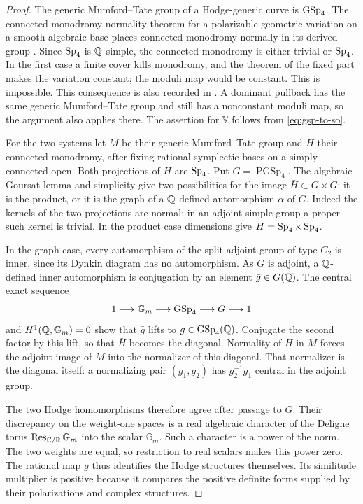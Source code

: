 \begin{proof}
The generic Mumford--Tate group of a Hodge-generic curve is $\operatorname{GSp}_4$.
The connected monodromy normality theorem for a polarizable geometric
variation on a smooth algebraic base places connected monodromy normally
in its derived group \cite[\S5, Theorem~1]{Andre1992}.  Since $\operatorname{Sp}_4$ is
$\mathbb Q$-simple, the connected monodromy is either trivial or $\operatorname{Sp}_4$.
In the first case a finite cover kills monodromy, and the theorem of the
fixed part makes the variation constant; the moduli map would be
constant.  This is impossible.  This consequence is also recorded in
\cite[\S6, Remark~1]{Andre1992}.  A dominant pullback has the same generic
Mumford--Tate group and still has a nonconstant moduli map, so the argument
also applies there.  The assertion for $\mathbb V$ follows from
\eqref{eq:gsp-to-so}.

For the two systems let $M$ be their generic Mumford--Tate group and
$H$ their connected monodromy, after fixing rational symplectic bases
on a simply connected open.  Both projections of $H$ are $\operatorname{Sp}_4$.
Put $G=\operatorname{PGSp}_4$.  The algebraic Goursat lemma and simplicity
give two possibilities for the image $\bar H\subset G\times G$:
it is the product, or it is the graph of a $\mathbb Q$-defined automorphism
$\alpha$ of $G$.  Indeed the kernels of the two projections are normal;
in an adjoint simple group a proper such kernel is trivial.  In the
product case dimensions give $H=\operatorname{Sp}_4\times\operatorname{Sp}_4$.

In the graph case, every automorphism of the split adjoint group of type
$C_2$ is inner, since its Dynkin diagram has no automorphism.  As $G$ is
adjoint, a $\mathbb Q$-defined inner automorphism is conjugation by an element
$\bar g\in G(\mathbb Q)$.  The central exact sequence
\[
 1\longrightarrow\mathbb G_m\longrightarrow\operatorname{GSp}_4
 \longrightarrow G\longrightarrow1
\]
and $H^1(\mathbb Q,\mathbb G_m)=0$ show that $\bar g$ lifts to
$g\in\operatorname{GSp}_4(\mathbb Q)$.  Conjugate the second factor by this lift, so that
$\bar H$ becomes the diagonal.  Normality of $H$ in $M$ forces the
adjoint image of $M$ into the normalizer of this diagonal.  That
normalizer is the diagonal itself: a normalizing pair $(g_1,g_2)$ has
$g_2^{-1}g_1$ central in the adjoint group.

The two Hodge homomorphisms therefore agree after passage to $G$.
Their discrepancy on the weight-one spaces is a real algebraic
character of the Deligne torus
$\operatorname{Res}_{\mathbb C/\mathbb R}\mathbb G_m$ into the scalar $\mathbb G_m$.
Such a character is a power of the norm.  The two weights are equal,
so restriction to real scalars makes this power zero.  The rational
map $g$ thus identifies the Hodge structures themselves.  Its
similitude multiplier is positive because it compares the positive
definite forms supplied by their polarizations and complex structures.


\end{proof}
